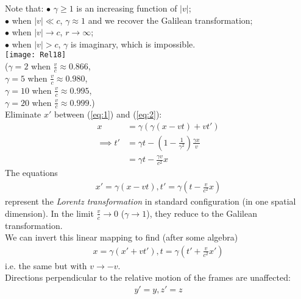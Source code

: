 \documentclass[a4paper]{article}
\begin{document}
Note that:
$\bullet$ $\gamma \geq 1$ is an increasing function of $|v|$;\\
$\bullet$ when $|v| \ll c$, $\gamma \approx 1$ and we recover the Galilean transformation;\\
$\bullet$ when $|v| \to c$, $r\to\infty$;\\
$\bullet$ when $|v| > c$, $\gamma$ is imaginary, which is impossible.\\
\texttt{[image: Rel18]}\\
($\gamma = 2$ when $\frac{v}{c} \approx 0.866$,\\
$\gamma = 5$ when $\frac{v}{c} \approx 0.980$,\\
$\gamma = 10$ when $\frac{v}{c} \approx 0.995$,\\
$\gamma = 20$ when $\frac{v}{c} \approx 0.999$.)\\
Eliminate $x'$ between (\ref{eq:1}) and (\ref{eq:2}):
\begin{equation*}
\begin{aligned}
x&=\gamma \left(\gamma \left(x-vt\right)+vt'\right)\\
\implies t'&=\gamma t-\left(1-\frac{1}{\gamma^2}\right) \frac{\gamma x}{v}\\
&= \gamma t - \frac{\gamma v}{c^2}x
\end{aligned}
\end{equation*}
The equations
\begin{equation*}
\begin{aligned}
x'=\gamma\left(x-vt\right), t'=\gamma\left(t-\frac{v}{c^2}x\right)
\end{aligned}
\end{equation*}
represent the \emph{Lorentz transformation} in standard configuration (in one spatial dimension). In the limit $\frac{v}{c}\to 0$ ($\gamma \to 1$), they reduce to the Galilean transformation.\\
We can invert this linear mapping to find (after some algebra)
\begin{equation*}
\begin{aligned}
x=\gamma\left(x'+vt'\right), t=\gamma\left(t'+\frac{v}{c^2}x'\right)
\end{aligned}
\end{equation*}
i.e. the same but with $v\to -v$.\\
Directions perpendicular to the relative motion of the frames are unaffected:
\begin{equation*}
\begin{aligned}
y'=y, z'=z
\end{aligned}
\end{equation*}
\end{document}
